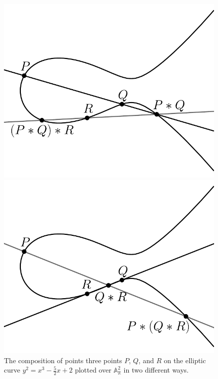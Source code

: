 \documentclass[openany, a4paper, 10pt]{book}
\theoremstyle{plain}
\theoremstyle{plain}
\theoremstyle{plain}
\theoremstyle{definition}
\theoremstyle{plain}
\theoremstyle{definition}
\theoremstyle{remark}
\begin{document}
\begin{figure}[ht]
    \centering
    \vspace{-1em}
    \begin{minipage}{.5\textwidth}
        \centering
        \includegraphics[width=.8\textwidth]{../build_plots/elliptic_curve_composition_1}
    \end{minipage}%
    \begin{minipage}{.5\textwidth}
        \centering
        \includegraphics[width=.8\textwidth]{../build_plots/elliptic_curve_composition_2}
    \end{minipage}
    \vspace{-1em}
    \caption{The composition of points three points $P$, $Q$, and $R$ on the elliptic curve $y^2 = x^3 - \frac{5}{2}x + 2$ plotted over $\mathbb A_{\mathbb R}^2$ in two different ways.}
    \label{fig:composition_associative}
\end{figure}
\end{document}
